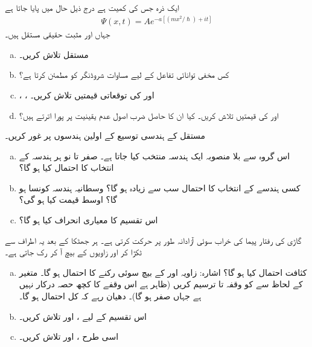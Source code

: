 ایک ذرہ جس کی کمیت  ہے درج ذیل حال میں پایا جاتا ہے 
\begin{align*}
\Psi (x,t)=Ae^{-a[(mx^{2}/\hslash)+it]}
\end{align*}
جہاں  اور  مثبت حقیقی مستقل ہیں۔
\begin{enumerate}[a.]
\item
مستقل  تلاش کریں۔
\item
کس مخفی توانائی تفاعل  کے لیے  مساوات شروڈنگر کو مطمئن کرتا ہے؟
\item
{}، ،  اور  کی توقعاتی قیمتیں تلاش کریں۔
\item
{} اور  کی قیمتیں تلاش کریں۔ کیا ان کا حاصل ضرب اصول عدم یقینیت پر پورا اترتے ہیں؟
\end{enumerate}
مستقل  کے  ہندسی  توسیع  کے اولین  ہندسوں   پر غور کریں۔
\begin{enumerate}[a.]
\item
اس گروہ سے بلا منصوبہ ایک ہندسہ  منتخب کیا جاتا ہے۔ صفر تا نو ہر ہندسہ کے انتخاب کا احتمال کیا ہو گا؟
\item
 کسی ہندسے کے انتخاب کا احتمال سب سے زیادہ ہو گا؟ وسطانیہ ہندسہ کونسا ہو گا؟ اوسط قیمت کیا ہو گی؟
\item
اس تقسیم کا معیاری انحراف کیا ہو گا؟
\end{enumerate}
گاڑی کی رفتار پیما کی خراب سوئی آزادانہ  طور پر حرکت کرتی ہے۔ ہر جھٹکا کے بعد یہ اطراف سے ٹکڑا کر  اور  زاویوں کے بیچ آ کر رک جاتی ہے۔
\begin{enumerate}[a.] 
\item

کثافت احتمال  کیا ہو گا؟ اشارہ: زاویہ  اور  کے بیچ سوئی رکنے کا احتمال  ہو گا۔ متغیر  کے لحاظ سے  کو وقفہ تا  ترسیم کریں (ظاہر ہے اس وقفے کا کچھ حصہ درکار نہیں ہے جہاں  صفر ہو گا)۔ دھیان رہے کہ کل احتمال  ہو گا۔
\item
اس تقسیم کے لیے ،  اور  تلاش  کریں۔
\item
 اسی طرح ،  اور  تلاش کریں۔
\end{enumerate}


